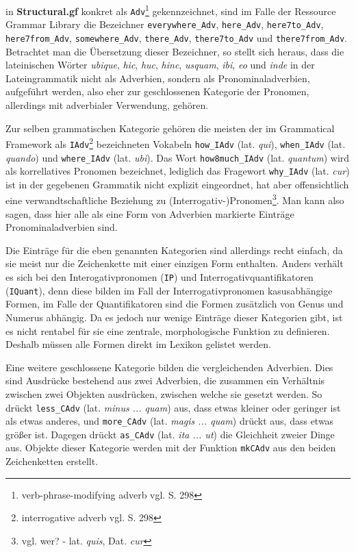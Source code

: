 in \textbf{Structural.gf} konkret als \texttt{Adv}\footnote{verb-phrase-modifying adverb vgl. \cite{RANTA2011} S. 298} gekennzeichnet, sind im Falle der Ressource Grammar Library die Bezeichner \texttt{everywhere\_Adv}, \texttt{here\_Adv}, \texttt{here7to\_Adv}, \texttt{here7from\_Adv}, \texttt{somewhere\_Adv}, \texttt{there\_Adv}, \texttt{there7to\_Adv} und \texttt{there7from\_Adv}. Betrachtet man die Übersetzung dieser Bezeichner, so stellt sich heraus, dass die lateinischen Wörter \textit{ubique}, \textit{hic}, \textit{huc}, \textit{hinc}, \textit{usquam}, \textit{ibi}, \textit{eo} und \textit{inde} in der Lateingrammatik nicht als Adverbien, sondern als Pronominaladverbien, aufgeführt werden, also eher zur geschlossenen Kategorie der Pronomen, allerdings mit adverbialer Verwendung, gehören. \par
Zur selben grammatischen Kategorie gehören die meisten der im Grammatical Framework als \texttt{IAdv}\footnote{interrogative adverb vgl. \cite{RANTA2011} S. 298} bezeichneten Vokabeln \texttt{how\_IAdv} (lat. \textit{qui}), \texttt{when\_IAdv} (lat. \textit{quando}) und \texttt{where\_IAdv} (lat. \textit{ubi}). Das Wort \texttt{how8much\_IAdv} (lat. \textit{quantum}) wird als korrellatives Pronomen bezeichnet, lediglich das Fragewort \texttt{why\_IAdv} (lat. \textit{cur}) ist in der gegebenen Grammatik nicht explizit eingeordnet, hat aber offensichtlich eine verwandtschaftliche Beziehung zu (Interrogativ-)Pronomen\footnote {vgl. wer? -  lat. \textit{quis}, Dat. \textit{cur}}. Man kann also sagen, dass hier alle als eine Form von Adverbien markierte Einträge Pronominaladverbien sind.\par
Die Einträge für die eben genannten Kategorien sind allerdings recht einfach, da sie meist nur die Zeichenkette mit einer einzigen Form enthalten. Anders verhält es sich bei den Interogativpronomen (\texttt{IP}) und Interrogativquantifikatoren (\texttt{IQuant}), denn diese bilden im Fall der Interrogativpronomen kasusabhängige Formen, im Falle der Quantifikatoren sind die Formen zusätzlich von Genus und Numerus abhängig. Da es jedoch nur wenige Einträge dieser Kategorien gibt, ist es nicht rentabel für sie eine zentrale, morphologische Funktion zu definieren. Deshalb müssen alle Formen direkt im Lexikon gelistet werden. \par
Eine weitere geschlossene Kategorie bilden die vergleichenden Adverbien. Dies sind Ausdrücke bestehend aus zwei Adverbien, die zusammen ein Verhältnis zwischen zwei Objekten ausdrücken, zwischen welche sie gesetzt werden. So drückt \texttt{less\_CAdv} (lat. \textit{minus ... quam}) aus, dass etwas kleiner oder geringer ist als etwas anderes, und \texttt{more\_CAdv} (lat. \textit{magis ... quam}) drückt aus, dass etwas größer ist. Dagegen drückt \texttt{as\_CAdv} (lat. \textit{ita ... ut}) die Gleichheit zweier Dinge aus. Objekte dieser Kategorie werden mit der Funktion \texttt{mkCAdv} aus den beiden Zeichenketten erstellt. \par
